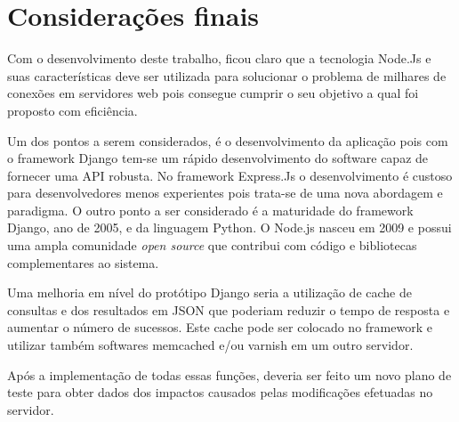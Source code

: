 \chapter{Considerações finais}
\label{conslusao-e-trabalhos-furutos}

\vspace{-1.9cm}


  Com o desenvolvimento deste trabalho, ficou claro que a tecnologia Node.Js e suas características
  deve ser utilizada para solucionar o problema de milhares de conexões em servidores web pois consegue 
  cumprir o seu objetivo a qual foi proposto com eficiência.
  
  Um dos pontos a serem considerados, é o desenvolvimento da aplicação pois com o framework Django tem-se um rápido 
  desenvolvimento do software capaz de fornecer uma API robusta. No framework Express.Js o desenvolvimento
  é custoso para desenvolvedores menos experientes pois trata-se de uma nova abordagem e paradigma. 
  O outro ponto a ser considerado é a maturidade do framework Django, ano de 2005, e da linguagem Python. O Node.js
  nasceu em 2009 e possui uma ampla comunidade \textit{open source} que contribui com código e bibliotecas complementares
  ao sistema. 
  
  Uma melhoria em nível do protótipo Django seria a utilização de cache de consultas e dos resultados em JSON que poderiam
  reduzir o tempo de resposta e aumentar o número de sucessos. Este cache pode ser colocado no framework e utilizar também
  softwares memcached e/ou varnish em um outro servidor.\cite{UsandoDjango:2013}

  Após a implementação de todas essas funções, deveria ser feito um novo plano de
  teste para obter dados dos impactos causados pelas modificações efetuadas no
  servidor.
